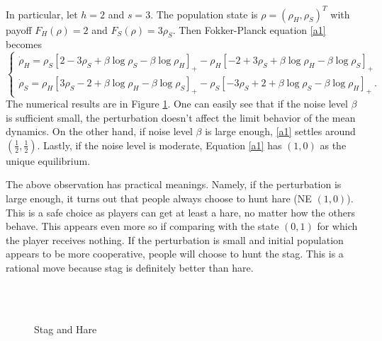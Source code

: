 \documentclass[11pt,reqno]{amsart}
\begin{document}
In particular, let $h=2$ and $s=3$. The population state is $\rho=(\rho_H,\rho_S)^T$ with payoff $F_H(\rho)=2$ and $F_S(\rho)=3\rho_S$.
Then Fokker-Planck equation \eqref{a1} becomes 
\begin{equation*}
\begin{cases}
\dot \rho_H= \rho_S[2-3\rho_S+\beta\log\rho_S-\beta\log\rho_H]_+-\rho_{H}[-2+3\rho_S+\beta\log\rho_H-\beta\log\rho_S]_+\\
\dot\rho_S=\rho_H[3\rho_S-2+\beta\log\rho_H-\beta\log\rho_S]_+-\rho_{S}[-3\rho_S+2+\beta\log\rho_S-\beta\log\rho_H]_+\ .
\end{cases}
\end{equation*}
The numerical results are in Figure \ref{stag-hare}. One can easily see that if
the noise level $\beta$ is 
sufficient small, the perturbation doesn't affect the limit behavior of the mean
dynamics. On the other hand, if noise level $\beta$ is large enough, 
\eqref{a1} settles around $(\frac{1}{2}, \frac{1}{2})$. Lastly, if the noise
level is moderate, Equation \eqref{a1} has  $(1,0)$ as the unique equilibrium.    

The above observation has practical meanings. Namely, if the perturbation is large
enough, it turns out that people always choose to hunt hare (NE $(1,0)$). This
is a safe choice as players can get at least a hare, no matter how the
others behave. This appears even more so  if comparing with the
state $(0,1)$ for which the player receives nothing. If the perturbation is
small and initial population appears to be more cooperative, people will choose
to hunt the stag.  This is a rational move because stag is definitely better
than hare.  
\begin{figure}[H]
 \hspace{0cm}
 \\
 \hspace{0cm}
 \\
\caption{Stag and Hare}
\label{stag-hare}
\end{figure}
\end{document}
